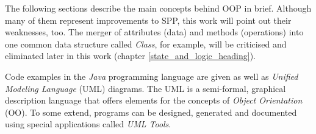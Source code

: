 The following sections describe the main concepts behind OOP in brief. Although
many of them represent improvements to SPP, this work will point out their
weaknesses, too. The merger of attributes (data) and methods (operations) into
one common data structure called \emph{Class}, for example, will be criticised
and eliminated later in this work (chapter \ref{state_and_logic_heading}).

Code examples in the \emph{Java} programming language are given as well as
\emph{Unified Modeling Language} (UML) diagrams. The UML is a semi-formal,
graphical description language that offers elements for the concepts of
\emph{Object Orientation} (OO). To some extend, programs can be designed,
generated and documented using special applications called \emph{UML Tools}.










